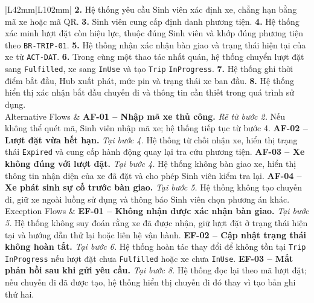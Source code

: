\begin{longtable}{|L{42mm}|L{102mm}|}
    \textbf{2.} Hệ thống yêu cầu Sinh viên xác định xe, chẳng hạn bằng mã xe hoặc mã QR.\newline
    \textbf{3.} Sinh viên cung cấp định danh phương tiện.\newline
    \textbf{4.} Hệ thống xác minh lượt đặt còn hiệu lực, thuộc đúng Sinh viên và khớp đúng phương tiện theo \texttt{BR-TRIP-01}.\newline
    \textbf{5.} Hệ thống nhận xác nhận bàn giao và trạng thái hiện tại của xe từ \texttt{ACT-DAT}.\newline
    \textbf{6.} Trong cùng một thao tác nhất quán, hệ thống chuyển lượt đặt sang \texttt{Fulfilled}, xe sang \texttt{InUse} và tạo \texttt{Trip} \texttt{InProgress}.\newline
    \textbf{7.} Hệ thống ghi thời điểm bắt đầu, Hub xuất phát, mức pin và trạng thái xe ban đầu.\newline
    \textbf{8.} Hệ thống hiển thị xác nhận bắt đầu chuyến đi và thông tin cần thiết trong quá trình sử dụng.\\\hline
  Alternative Flows &
    \textbf{AF-01 -- Nhập mã xe thủ công.} \textit{Rẽ từ bước 2.} Nếu không thể quét mã, Sinh viên nhập mã xe; hệ thống tiếp tục từ bước 4.\newline
    \textbf{AF-02 -- Lượt đặt vừa hết hạn.} \textit{Tại bước 4.} Hệ thống từ chối nhận xe, hiển thị trạng thái \texttt{Expired} và cung cấp hành động quay lại tra cứu phương tiện.\newline
    \textbf{AF-03 -- Xe không đúng với lượt đặt.} \textit{Tại bước 4.} Hệ thống không bàn giao xe, hiển thị thông tin nhận diện của xe đã đặt và cho phép Sinh viên kiểm tra lại.\newline
    \textbf{AF-04 -- Xe phát sinh sự cố trước bàn giao.} \textit{Tại bước 5.} Hệ thống không tạo chuyến đi, giữ xe ngoài luồng sử dụng và thông báo Sinh viên chọn phương án khác.\\\hline
  Exception Flows &
    \textbf{EF-01 -- Không nhận được xác nhận bàn giao.} \textit{Tại bước 5.} Hệ thống không suy đoán rằng xe đã được nhận, giữ lượt đặt ở trạng thái hiện tại và hướng dẫn thử lại hoặc liên hệ vận hành.\newline
    \textbf{EF-02 -- Cập nhật trạng thái không hoàn tất.} \textit{Tại bước 6.} Hệ thống hoàn tác thay đổi để không tồn tại \texttt{Trip} \texttt{InProgress} nếu lượt đặt chưa \texttt{Fulfilled} hoặc xe chưa \texttt{InUse}.\newline
    \textbf{EF-03 -- Mất phản hồi sau khi gửi yêu cầu.} \textit{Tại bước 8.} Hệ thống đọc lại theo mã lượt đặt; nếu chuyến đi đã được tạo, hệ thống hiển thị chuyến đi đó thay vì tạo bản ghi thứ hai.\newline

\end{longtable}
